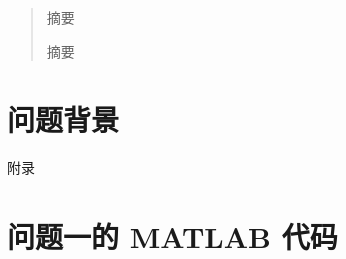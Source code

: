 \documentclass{MMCStyle}
\numberwithin{equation}{section}
\begin{document}
    \begin{abstract}

        摘要\cite{DSJS202403017}

        摘要
    \end{abstract}

    \tableofcontents
    \section{问题背景}


	

	\newpage
	\appendix
	\begin{center}
		\heiti{} 附\hspace{1pc}录
	\end{center}
	\section{问题一的 MATLAB 代码}
\end{document}
